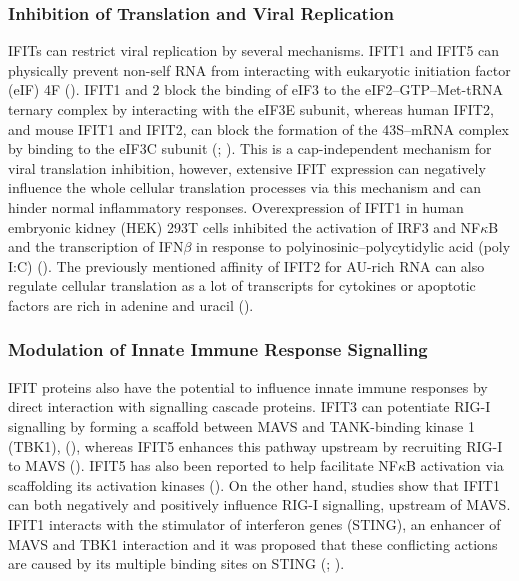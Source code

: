 \subsubsection{Inhibition of Translation and Viral Replication} \label{Inhibition of Translation and Viral Replication}
IFITs can restrict viral replication by several mechanisms. IFIT1 and IFIT5 can physically prevent non-self RNA from interacting with eukaryotic initiation factor (eIF) 4F (\cite{Kumar2014InhibitionMRNAs}). IFIT1 and 2 block the binding of eIF3 to the eIF2–GTP–Met-tRNA ternary complex by interacting with the eIF3E subunit, whereas human IFIT2, and mouse IFIT1 and IFIT2, can block the formation of the 43S–mRNA complex by binding to the eIF3C subunit (\cite{Diamond2014IFIT1:Translation}; \cite{Guo2000CharacterizationVirus}). This is a cap-independent mechanism for viral translation inhibition, however, extensive IFIT expression can negatively influence the whole cellular translation processes via this mechanism and can hinder normal inflammatory responses. Overexpression of IFIT1 in human embryonic kidney (HEK) 293T cells inhibited the activation of IRF3 and NF\(\kappa\)B and the transcription of IFN\(\beta\) in response to polyinosinic–polycytidylic acid (poly I:C) (\cite{Li2009ISG56Response}). The previously mentioned affinity of IFIT2 for AU-rich RNA can also regulate cellular translation as a lot of transcripts for cytokines or apoptotic factors are rich in adenine and uracil (\cite{Palanisamy2012ControlMicroRNAs}). 




\subsubsection{Modulation of Innate Immune Response Signalling} \label{Modulation of Innate Immune Response Signalling}
IFIT proteins also have the potential to influence innate immune responses by direct interaction with signalling cascade proteins. IFIT3 can potentiate RIG-I signalling by forming a scaffold between MAVS and TANK-binding kinase 1 (TBK1), (\cite{Liu2011IFN-InducedTBK1}), whereas IFIT5 enhances this pathway upstream by recruiting RIG-I to MAVS (\cite{Zhang2013IFIT5Pathways}). IFIT5 has also been reported to help facilitate NF\(\kappa\)B activation via scaffolding its activation kinases (\cite{Zhang2013IFIT5Pathways}). On the other hand, studies show that IFIT1 can both negatively and positively influence RIG-I signalling, upstream of MAVS. IFIT1 interacts with the stimulator of interferon genes (STING), an enhancer of MAVS and TBK1 interaction and it was proposed that these conflicting actions are caused by its multiple binding sites on STING (\cite{Li2009ISG56Response}; \cite{Reynaud2015IFIT1Interferon}). 




